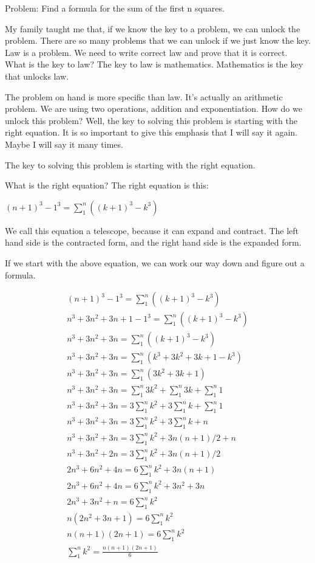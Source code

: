 Problem: Find a formula for the sum of the first n squares.

My family taught me that, if we know the key to a problem, we can unlock the problem. There are so many problems that we can unlock if we just know the key. Law is a problem. We need to write correct law and prove that it is correct. What is the key to law? The key to law is mathematics. Mathematics is the key that unlocks law.

The problem on hand is more specific than law. It's actually an arithmetic problem. We are using two operations, addition and exponentiation. How do we unlock this problem? Well, the key to solving this problem is starting with the right equation. It is so important to give this emphasis that I will say it again. Maybe I will say it many times.

The key to solving this problem is starting with the right equation.

What is the right equation? The right equation is this:

$(n+1)^3 - 1^3 = \sum_1^n ((k+1)^3 - k^3)$

We call this equation a telescope, because it can expand and contract. The left hand side is the contracted form, and the right hand side is the expanded form.

If we start with the above equation, we can work our way down and figure out a formula.

\begin{align*}
(n+1)^3 - 1^3 = \sum_1^n ((k+1)^3 - k^3) \\
n^3 + 3n^2 + 3n + 1 - 1^3 = \sum_1^n ((k+1)^3 - k^3) \\
n^3 + 3n^2 + 3n = \sum_1^n ((k+1)^3 - k^3) \\
n^3 + 3n^2 + 3n = \sum_1^n (k^3 + 3k^2 + 3k + 1 - k^3) \\
n^3 + 3n^2 + 3n = \sum_1^n (3k^2 + 3k + 1) \\
n^3 + 3n^2 + 3n = \sum_1^n 3k^2 + \sum_1^n 3k + \sum_1^n 1 \\
n^3 + 3n^2 + 3n = 3 \sum_1^n k^2 + 3 \sum_1^n k + \sum_1^n 1 \\
n^3 + 3n^2 + 3n = 3 \sum_1^n k^2 + 3 \sum_1^n k + n \\
n^3 + 3n^2 + 3n = 3 \sum_1^n k^2 + 3n(n+1)/2 + n \\
n^3 + 3n^2 + 2n = 3 \sum_1^n k^2 + 3n(n+1)/2 \\
2n^3 + 6n^2 + 4n = 6 \sum_1^n k^2 + 3n(n+1) \\
2n^3 + 6n^2 + 4n = 6 \sum_1^n k^2 + 3n^2 + 3n \\
2n^3 + 3n^2 + n = 6 \sum_1^n k^2 \\
n(2n^2 + 3n + 1) = 6 \sum_1^n k^2 \\
n(n + 1)(2n + 1) = 6 \sum_1^n k^2 \\
\sum_1^n k^2 = \frac{n(n + 1)(2n + 1)}{6} \\
\end{align*}

